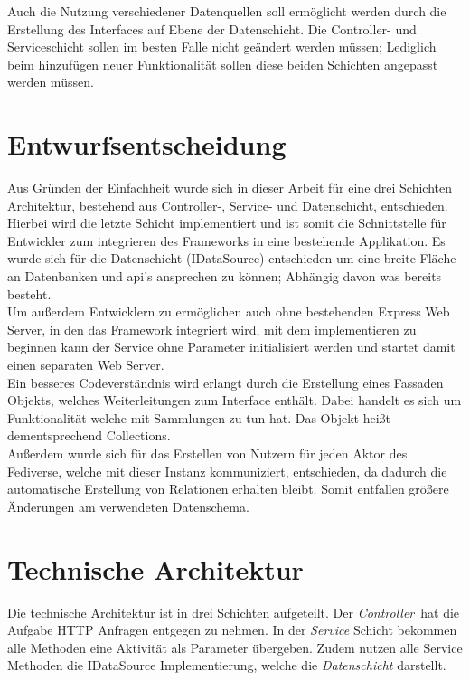	Auch die Nutzung verschiedener Datenquellen soll ermöglicht werden durch die Erstellung des Interfaces auf Ebene der Datenschicht. Die Controller- und Serviceschicht sollen im besten Falle nicht geändert werden müssen; Lediglich beim hinzufügen neuer Funktionalität sollen diese beiden Schichten angepasst werden müssen.
\section{Entwurfsentscheidung}
	Aus Gründen der Einfachheit wurde sich in dieser Arbeit für eine drei Schichten Architektur, bestehend aus Controller-, Service- und Datenschicht, entschieden. Hierbei wird die letzte Schicht implementiert und ist somit die Schnittstelle für Entwickler zum integrieren des Frameworks in eine bestehende Applikation. Es wurde sich für die Datenschicht (IDataSource) entschieden um eine breite Fläche an Datenbanken und \gls{api}'s ansprechen zu können; Abhängig davon was bereits besteht.\\
	
	Um außerdem Entwicklern zu ermöglichen auch ohne bestehenden Express Web Server, in den das Framework integriert wird, mit dem implementieren zu beginnen kann der Service ohne Parameter initialisiert werden und startet damit einen separaten Web Server.\\
	
	Ein besseres Codeverständnis wird erlangt durch die Erstellung eines Fassaden Objekts, welches Weiterleitungen zum Interface enthält. Dabei handelt es sich um Funktionalität welche mit Sammlungen zu tun hat. Das Objekt heißt dementsprechend \glqq Collections\grqq.\\
	
	Außerdem wurde sich für das Erstellen von Nutzern für jeden Aktor des Fediverse, welche mit dieser Instanz kommuniziert, entschieden, da dadurch die automatische Erstellung von Relationen erhalten bleibt. Somit entfallen größere Änderungen am verwendeten Datenschema.
\section{Technische Architektur}
	Die technische Architektur ist in drei Schichten aufgeteilt. Der \textit{ Controller}~hat die Aufgabe HTTP Anfragen entgegen zu nehmen. In der \textit{Service} Schicht bekommen alle Methoden eine Aktivität als Parameter übergeben. Zudem nutzen alle Service Methoden die IDataSource Implementierung, welche die \textit{Datenschicht} darstellt.\\
	
